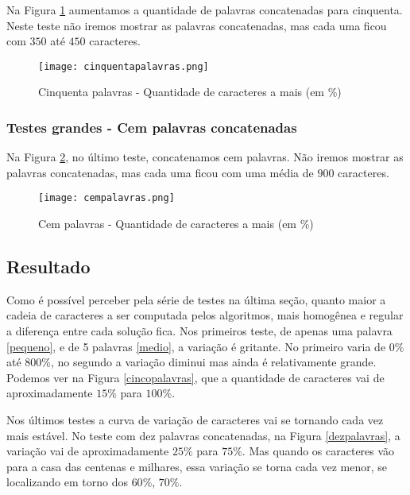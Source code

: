 \documentclass[12pt]{article}
\begin{document}
Na Figura \ref{cinquentapalavras} aumentamos a quantidade de palavras concatenadas para cinquenta. Neste teste não iremos mostrar as palavras concatenadas, mas cada uma ficou com $350$ até $450$ caracteres.

    \begin{figure}[h!]
        \centering
        \texttt{[image: cinquentapalavras.png]}
        \caption{Cinquenta palavras - Quantidade de caracteres a mais (em \%)}
        \label{cinquentapalavras}
    \end{figure}

\subsubsection{Testes grandes - Cem palavras concatenadas}
\label{grande100}

Na Figura \ref{cempalavras}, no último teste, concatenamos cem palavras. Não iremos mostrar as palavras concatenadas, mas cada uma ficou com uma média de $900$ caracteres.

    \begin{figure}[h!]
        \centering
        \texttt{[image: cempalavras.png]}
        \caption{Cem palavras - Quantidade de caracteres a mais (em \%)}
        \label{cempalavras}
    \end{figure}

\subsection{Resultado}

	Como é possível perceber pela série de testes na última seção, quanto maior a cadeia de caracteres a ser computada pelos algoritmos, mais homogênea e regular a diferença entre cada solução fica. Nos primeiros teste, de apenas uma palavra \ref{pequeno}, e de 5 palavras \ref{medio}, a variação é gritante. No primeiro varia de $0\%$ até $800\%$, no segundo a variação diminui mas ainda é relativamente grande. Podemos ver na Figura \ref{cincopalavras}, que a quantidade de caracteres vai de aproximadamente $15\%$ para $100\%$.

	Nos últimos testes a curva de variação de caracteres vai se tornando cada vez mais estável. No teste com dez palavras concatenadas, na Figura \ref{dezpalavras}, a variação vai de aproximadamente $25\%$ para $75\%$. Mas quando os caracteres vão para a casa das centenas e milhares, essa variação se torna cada vez menor, se localizando em torno dos $60\%$, $70\%$.
\end{document}
